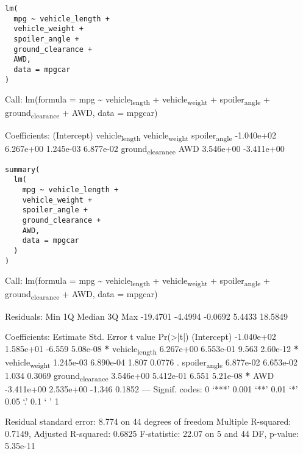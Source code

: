 \documentclass[11pt]{article}
\begin{document}
\begin{verbatim}
lm(
  mpg ~ vehicle_length +
  vehicle_weight +
  spoiler_angle +
  ground_clearance +
  AWD,
  data = mpgcar
)
\end{verbatim}

\begin{org}


Call:
lm(formula = mpg \textasciitilde{} vehicle\textsubscript{length} + vehicle\textsubscript{weight} + spoiler\textsubscript{angle} +
    ground\textsubscript{clearance} + AWD, data = mpgcar)

Coefficients:
     (Intercept)    vehicle\textsubscript{length}    vehicle\textsubscript{weight}     spoiler\textsubscript{angle}
      -1.040e+02         6.267e+00         1.245e-03         6.877e-02
ground\textsubscript{clearance}               AWD
       3.546e+00        -3.411e+00
\end{org}

\begin{verbatim}
summary(
  lm(
    mpg ~ vehicle_length +
    vehicle_weight +
    spoiler_angle +
    ground_clearance +
    AWD,
    data = mpgcar
  )
)
\end{verbatim}

\begin{org}


Call:
lm(formula = mpg \textasciitilde{} vehicle\textsubscript{length} + vehicle\textsubscript{weight} + spoiler\textsubscript{angle} +
    ground\textsubscript{clearance} + AWD, data = mpgcar)

Residuals:
     Min       1Q   Median       3Q      Max
-19.4701  -4.4994  -0.0692   5.4433  18.5849

Coefficients:
                   Estimate Std. Error t value Pr(>|t|)
(Intercept)      -1.040e+02  1.585e+01  -6.559 5.08e-08 \textbf{*}
vehicle\textsubscript{length}    6.267e+00  6.553e-01   9.563 2.60e-12 \textbf{*}
vehicle\textsubscript{weight}    1.245e-03  6.890e-04   1.807   0.0776 .
spoiler\textsubscript{angle}     6.877e-02  6.653e-02   1.034   0.3069
ground\textsubscript{clearance}  3.546e+00  5.412e-01   6.551 5.21e-08 \textbf{*}
AWD              -3.411e+00  2.535e+00  -1.346   0.1852
---
Signif. codes:  0 ‘***’ 0.001 ‘**’ 0.01 ‘*’ 0.05 ‘.’ 0.1 ‘ ’ 1

Residual standard error: 8.774 on 44 degrees of freedom
Multiple R-squared:  0.7149,	Adjusted R-squared:  0.6825
F-statistic: 22.07 on 5 and 44 DF,  p-value: 5.35e-11
\end{org}
\end{document}
